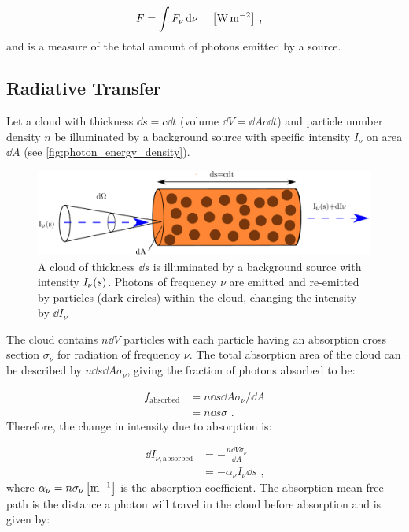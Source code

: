\begin{equation}
	\begin{aligned}
		F&=\int F_\nu \dd{\nu}\,\quad\qty[\si{\watt\per\meter\squared}]\text{ ,}
	\end{aligned}
\end{equation}
\noindent and is a measure of the total amount of photons emitted by a source.

\subsection{Radiative Transfer}

Let a cloud with thickness $\dd{s}=c\dd{t}$ (volume $\dd{V}=\dd{A}c\dd{t}$) and particle number density $n$ be illuminated by a background source with specific intensity $I_\nu$ on area $\dd{A}$ (see \autoref{fig:photon_energy_density}).
\begin{figure}[b!]
	\centering
	\includegraphics[width=\textwidth]{06_Interstellar_Medium/Images/Theory/radiative_transfer.pdf}
	\caption{A cloud of thickness $\dd{s}$ is illuminated by a background source with intensity $I_\nu\qty(s)$. Photons of frequency $\nu$ are emitted and re-emitted by particles (dark circles) within the cloud, changing the intensity by $\dd{I_\nu}$}
	\label{fig:photon_energy_density}
\end{figure}
The cloud contains $n\dd{V}$ particles with each particle having an absorption cross section $\sigma_\nu$ for radiation of frequency $\nu$. The total absorption area of the cloud can be described by $n\dd{s}\dd{A}\sigma_\nu$, giving the fraction of photons absorbed to be:

\begin{equation}
    \begin{aligned}
        f_\text{absorbed}&=n\dd{s}\dd{A}\sigma_\nu/\dd{A} \\
        &=n\dd{s}\sigma \text{ .}
    \end{aligned}
\end{equation}
\noindent Therefore, the change in intensity due to absorption is:

\begin{equation}
    \begin{aligned}
        \dd{I_{\nu,\text{absorbed}}}&=- \frac{n\dd{V}\sigma_\nu}{\dd{A}} \\
        &= - \alpha_\nu I_\nu \dd{s}\text{ ,}
    \end{aligned}
\end{equation}
\noindent where $\alpha_\nu=n\sigma_\nu\,\qty[\si{\per\meter}]$ is the absorption coefficient. The absorption mean free path is the distance a photon will travel in the cloud before absorption and is given by:

